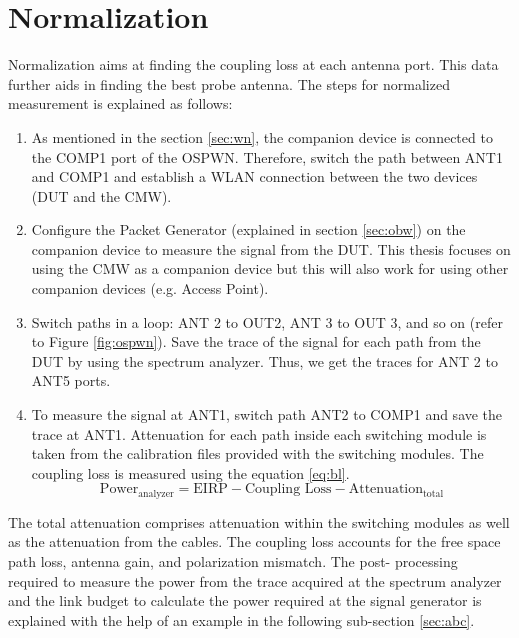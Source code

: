 \section{Normalization}
Normalization aims at finding the coupling loss at each antenna port. This data further aids in finding the best probe antenna. The steps for normalized measurement is explained as follows:
\begin{enumerate}
\item As mentioned in the section \ref{sec:wn}, the companion device is connected to the COMP1 port of the OSPWN. Therefore, switch the path between ANT1 and COMP1 and establish a \acs{WLAN} connection between the two devices (\acs{DUT} and the \acs{CMW}). 
\item Configure the Packet Generator (explained in section \ref{sec:obw}) on the companion device to measure the signal from the \acs{DUT}. This thesis focuses on using the CMW as a companion device but this will also work for using other companion devices (e.g. Access Point).
\item Switch paths in a loop: ANT 2 to OUT2, ANT 3 to OUT 3, and so on (refer to Figure \ref{fig:ospwn}). Save the trace of the signal for each path from the \acs{DUT} by using the spectrum analyzer. Thus, we get the traces for ANT 2 to ANT5 ports.
\item To measure the signal at ANT1, switch path ANT2 to COMP1 and save the trace at ANT1. Attenuation for each path inside each switching module is taken from the calibration files provided with the switching modules. The coupling loss is measured using the equation \ref{eq:bl}.
\begin{equation}
\mbox{Power}_{\mbox{analyzer}}  = \mbox{EIRP} - \mbox{Coupling Loss} - \mbox{Attenuation}_{\mbox{total}}  \label{eq:bl}
\end{equation}
\end{enumerate}
The total attenuation comprises attenuation within the switching modules as well as the attenuation from the cables. The coupling loss accounts for the free space path loss, antenna gain, and polarization mismatch. The post- processing required to measure the power from the trace acquired at the spectrum analyzer and the link budget to calculate the power required at the signal generator is explained with the help of an example in the following sub-section \ref{sec:abc}.


